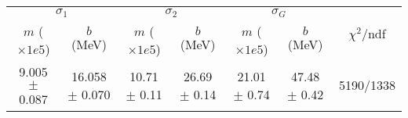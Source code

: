 \begin{tabular}{cc|cc|cc||c}
\multicolumn{2}{c|}{$\sigma_1$} & \multicolumn{2}{|c}{$\sigma_2$} & \multicolumn{2}{|c}{$\sigma_G$}  & \multirow{2}{*}{$\chi^2/$ndf}\\
$m$ ($\times1e5$) & $b$ (MeV) & $m$ ($\times1e5$) & $b$ (MeV) & $m$ ($\times1e5$) & $b$ (MeV) & \\
\hline
9.005 $\pm$ 0.087 & 16.058 $\pm$ 0.070 & 10.71 $\pm$ 0.11 & 26.69 $\pm$ 0.14 & 21.01 $\pm$ 0.74 & 47.48 $\pm$ 0.42 & 5190/1338\\
\end{tabular}
